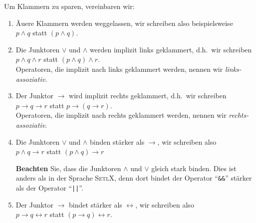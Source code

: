 \noindent
Um Klammern zu sparen, vereinbaren wir:
\begin{enumerate}
\item Ãu\3ere Klammern werden weggelassen, wir schreiben also beispielsweise \\[0.2cm]
      \hspace*{1.3cm} $p \wedge q$ \quad statt \quad $(p \wedge q)$.
\item Die Junktoren  $\vee$ und $\wedge$ werden implizit links geklammert, d.h.~wir
      schreiben 
      \\[0.2cm]
      \hspace*{1.3cm} $p \wedge q \wedge r$ \quad statt \quad $(p \wedge q) \wedge r$.
      \\[0.2cm]
      Operatoren, die implizit nach links geklammert werden, nennen wir \emph{links-assoziativ}.
\item Der Junktor $\rightarrow$ wird implizit rechts geklammert, d.h.~wir
      schreiben \\[0.2cm]
      \hspace*{1.3cm} $p \rightarrow q \rightarrow r$ \quad statt \quad $p \rightarrow (q \rightarrow r)$.
      \\[0.2cm]
      Operatoren, die implizit nach rechts geklammert werden, nennen wir \emph{rechts-assoziativ}.
\item Die Junktoren $\vee$ und $\wedge$ binden st\"{a}rker als $\rightarrow$, wir schreiben
      also \\[0.2cm]
      \hspace*{1.3cm} $p \wedge q \rightarrow r$ \quad statt \quad $(p \wedge q) \rightarrow r$

      \textbf{Beachten} Sie, dass die Junktoren $\wedge$ und $\vee$ gleich stark binden.  Dies ist
      anders als in der Sprache \textsc{SetlX}, denn dort bindet der Operator ``\texttt{\&\&}'' st\"{a}rker als
      der Operator ``\texttt{||}''.
\item Der Junktor $\rightarrow$ bindet st\"{a}rker als $\leftrightarrow$, wir schreiben
      also \\[0.2cm]
      \hspace*{1.3cm} $p \rightarrow q \leftrightarrow r$ \quad statt \quad $(p \rightarrow q) \leftrightarrow r$.
\end{enumerate}


